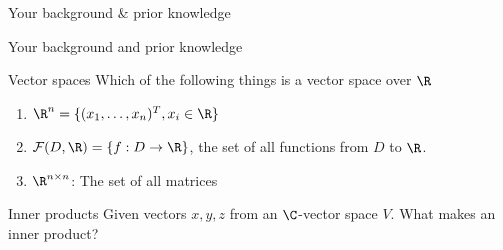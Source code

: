 \begin{frame}{Your background \& prior knowledge}
    \begin{center}
        \LARGE{Your background and prior knowledge}
    \end{center}
\end{frame}

\begin{frame}{Vector spaces}
    \noindent
    Which of the following things is a \alert{vector space} over $\R$
    \vspace{1em}
    \begin{enumerate}
        \item $\R^n = \{(x_1, \ldots, x_n)^T , x_i \in \R \}$
        \item $\mathcal{F}(D, \R) = \{f : D \to \R\}$,
            the set of all functions from $D$ to $\R$.
        \item $\R^{n\times n}$: The set of all matrices
    \end{enumerate}
    \vspace{1em}
\end{frame}

\begin{frame}{Inner products}
    \noindent
    Given vectors $x,y,z$ from an $\C$-vector space $V$.
    What makes an \alert{inner product}?
\end{frame}


